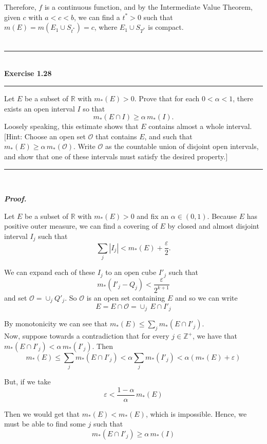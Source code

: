 \documentclass[a4paper,11pt]{article}
\begin{document}
Therefore, $f$ is a continuous function, and by the Intermediate Value Theorem, given $c$ with $a < c < b$, we can find a $t^* > 0$ such that $m(E) = m(E_1 \cup S_{t^*}) = c$, where $E_1 \cup S_{T^*}$ is compact.\\\\



\begin{flushleft}
	\rule[-0.5ex]{17cm}{2pt}\\
		\textbf{Exercise 1.28}\\
	\rule[1.5ex]{17cm}{0.5pt}
		Let $E$ be a subset of $\mathbb{R}$ with $m_*(E) > 0$. Prove that for each $0 < \alpha < 1$, there exists an open interval $I$ so that 
			$$m_*(E \cap I) \geq \alpha\,m_*(I).$$
		Loosely speaking, this estimate shows that $E$ contains almost a whole interval.\\
		$[$Hint: Choose an open set $\mathcal{O}$ that contains $E$, and such that $m_*(E) \geq \alpha\,m_*(\mathcal{O})$. Write $\mathcal{O}$ as the countable union of disjoint open intervals, and show that one of these intervals must satisfy the desired property.$]$
	\rule[1.0ex]{17cm}{0.5pt}\
\end{flushleft}

\textbf{\textit{Proof.}}

Let $E$ be a subset of $\mathbb{R}$ with $m_*(E) > 0$ and fix an $\alpha \in (0,1)$. Because $E$ has positive outer measure, we can find a covering of $E$ by closed and almost disjoint interval $I_j$ such that
	$$\sum_j |I_j| < m_*(E) + \frac{\varepsilon}{2}.$$

We can expand each of these $I_j$ to an open cube $I'_j$ such that
	$$m_*(I'_j - Q_j) < \frac{\varepsilon}{2^{k+1}}$$
and set $\mathcal{O} = \cup_j Q'_j$. So $\mathcal{O}$ is an open set containing $E$ and so we can write
	$$E = E \cap \mathcal{O} = \cup_j\,E \cap I'_j$$

By monotonicity we can see that $m_*(E) \leq \sum_j m_*(E \cap I'_j)$.\\

Now, suppose towards a contradiction that for every $j \in \mathbb{Z}^+$, we have that $m_*(E \cap I'_j) < \alpha\,m_*(I'_j)$. Then
	$$m_*(E)
	\leq \sum_j m_*(E \cap I'_j)
	< \alpha \sum_j m_*(I'_j)
	< \alpha(m_*(E) + \varepsilon)$$

But, if we take
	$$\varepsilon < \frac{1 - \alpha}{\alpha}\,m_*(E)$$

Then we would get that $m_*(E) < m_*(E)$, which is impossible. Hence, we must be able to find some $j$ such that
	$$m_*(E \cap I'_j) \geq \alpha\,m_*(I)$$\\\\
\end{document}
